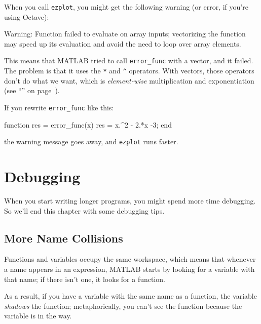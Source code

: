 
When you call \lstinline{ezplot}, you might get the following warning (or error, if you're using Octave):

\begin{code}
Warning: Function failed to evaluate on array inputs;
vectorizing the function may speed up its evaluation and 
avoid the need to loop over array elements. 
\end{code}

This means that MATLAB tried to call \lstinline{error_func} with a vector, and it failed. 
The problem is that it uses the \lstinline{*} and \lstinline{^} operators.  With vectors, those operators don't do what we want, which is \emph{element-wise} multiplication and exponentiation
(see ``'' on page~\pageref{elementwise}).


If you rewrite \lstinline{error_func} like this:

\begin{code}
function res = error_func(x)
    res = x.^2 - 2.*x -3;
end
\end{code}
the warning message goes away, and \lstinline{ezplot} runs faster.


\section{Debugging}

When you start writing longer programs, you might spend more time debugging.  So we'll end this chapter with some debugging tips.

\subsection{More Name Collisions}

Functions and variables occupy the same workspace, which means
that whenever a name appears in an expression, MATLAB starts by looking
for a variable with that name; if there isn't one, it looks for
a function.


As a result, if you have a variable with the same name as a function,
the variable \emph{shadows} the function; metaphorically, you can't see the function because the variable is in the way.  

